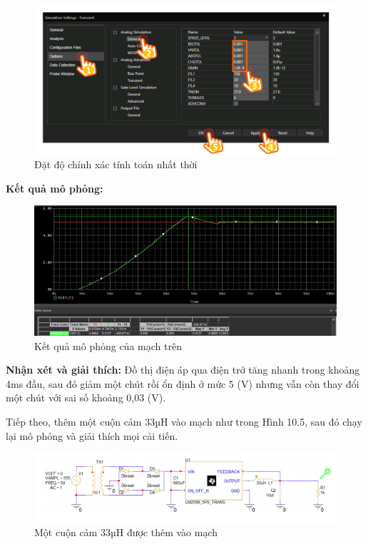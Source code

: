 \begin{figure}[ht]
    \centering
    \includegraphics[scale=0.3]{graphics/ex10/f3.png}
    \caption{Đặt độ chính xác tính toán nhất thời}
\end{figure}
\pagebreak
\textbf{Kết quả mô phỏng: }

\begin{figure}[ht]
    \centering
    \includegraphics[scale=0.22]{graphics/ex10/f6.png}
    \caption{Kết quả mô phỏng của mạch trên}
\end{figure}

\textbf{Nhận xét và giải thích:} Đồ thị điện áp qua điện trở tăng nhanh trong khoảng 4ms đầu, sau đó giảm một chút rồi ổn định ở mức 5 (V) nhưng vẫn còn thay đổi một chút với sai số khoảng 0,03 (V).
\pagebreak

Tiếp theo, thêm một cuộn cảm 33µH vào mạch như trong Hình 10.5, sau đó chạy lại mô phỏng và giải thích mọi cải tiến.

\begin{figure}[ht]
    \centering
    \includegraphics[scale=0.23]{graphics/ex10/f4.png}
    \caption{Một cuộn cảm 33µH được thêm vào mạch}
\end{figure}

